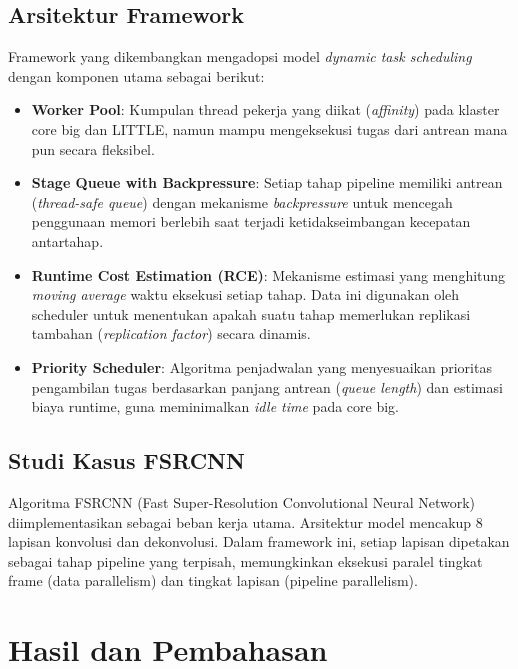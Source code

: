 \documentclass[conference]{IEEEtran}
\begin{document}
\subsection{Arsitektur Framework}
Framework yang dikembangkan mengadopsi model \textit{dynamic task scheduling} dengan komponen utama sebagai berikut:
\begin{itemize}
    \item \textbf{Worker Pool}: Kumpulan thread pekerja yang diikat (\textit{affinity}) pada klaster core big dan LITTLE, namun mampu mengeksekusi tugas dari antrean mana pun secara fleksibel.
    \item \textbf{Stage Queue with Backpressure}: Setiap tahap pipeline memiliki antrean (\textit{thread-safe queue}) dengan mekanisme \textit{backpressure} untuk mencegah penggunaan memori berlebih saat terjadi ketidakseimbangan kecepatan antartahap.
    \item \textbf{Runtime Cost Estimation (RCE)}: Mekanisme estimasi yang menghitung \textit{moving average} waktu eksekusi setiap tahap. Data ini digunakan oleh scheduler untuk menentukan apakah suatu tahap memerlukan replikasi tambahan (\textit{replication factor}) secara dinamis.
    \item \textbf{Priority Scheduler}: Algoritma penjadwalan yang menyesuaikan prioritas pengambilan tugas berdasarkan panjang antrean (\textit{queue length}) dan estimasi biaya runtime, guna meminimalkan \textit{idle time} pada core big.
\end{itemize}

\subsection{Studi Kasus FSRCNN}
Algoritma FSRCNN (Fast Super-Resolution Convolutional Neural Network) diimplementasikan sebagai beban kerja utama. Arsitektur model mencakup 8 lapisan konvolusi dan dekonvolusi. Dalam framework ini, setiap lapisan dipetakan sebagai tahap pipeline yang terpisah, memungkinkan eksekusi paralel tingkat frame (data parallelism) dan tingkat lapisan (pipeline parallelism).

\section{Hasil dan Pembahasan}
\end{document}
